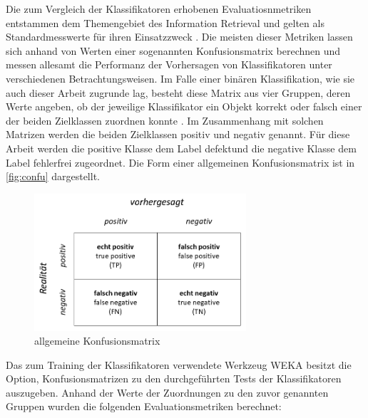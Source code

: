 Die zum Vergleich der Klassifikatoren erhobenen Evaluatiosnmetriken entstammen dem Themengebiet des Information Retrieval und gelten als Standardmesswerte für ihren Einsatzzweck \cite{Sammut2017}. Die meisten dieser Metriken lassen sich anhand von Werten einer sogenannten Konfusionsmatrix berechnen und messen allesamt die Performanz der Vorhersagen von Klassifikatoren unter verschiedenen Betrachtungsweisen. Im Falle einer binären Klassifikation,  wie sie auch dieser Arbeit zugrunde lag, besteht diese Matrix aus vier Gruppen, deren Werte angeben, ob der jeweilige Klassifikator ein Objekt korrekt oder falsch einer der beiden Zielklassen zuordnen konnte \cite{Sammut2017}. Im Zusammenhang mit solchen Matrizen werden die beiden Zielklassen \glqq positiv\grqq{} und \glqq negativ\grqq{} genannt. Für diese Arbeit werden die positive Klasse dem Label \glqq defekt\grqq und die negative Klasse dem Label \glqq fehlerfrei\grqq{} zugeordnet. Die Form einer allgemeinen Konfusionsmatrix ist in \autoref{fig:confu} dargestellt.

\begin{figure}[H]
    \centering
    \includegraphics[width=0.7\textwidth]{images/Confusion}
    \caption{allgemeine Konfusionsmatrix\label{fig:confu}}
\end{figure}

Das zum Training der Klassifikatoren verwendete Werkzeug WEKA besitzt die Option, Konfusionsmatrizen zu den durchgeführten Tests der Klassifikatoren auszugeben. Anhand der Werte der Zuordnungen zu den zuvor genannten Gruppen wurden die folgenden Evaluationsmetriken berechnet: 

